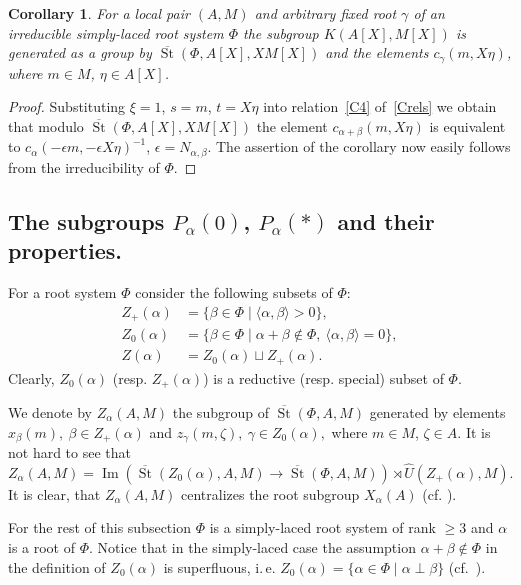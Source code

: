 \documentclass[oneside, 8pt]{amsart}
\newtheorem{corollary}{Corollary}
\theoremstyle{remark}
\theoremstyle{definition}
\DeclareMathOperator{\Img}{Im}
\DeclareMathOperator{\St}{St}
\numberwithin{equation}{section}
\begin{document}
\begin{corollary} \label{Kgen-strong} For a local pair $(A, M)$ and arbitrary fixed root $\gamma$ of an irreducible simply-laced root system $\Phi$ the subgroup $K(A[X], M[X])$ is generated as a group by $\overline{\St}(\Phi, A[X], XM[X])$ and the elements $c_{\gamma}(m, X\eta)$, where $m \in M$, $\eta \in A[X]$. \end{corollary}
\begin{proof} Substituting $\xi = 1$, $s = m$, $t = X\eta$ into relation~\eqref{C4} of~\cref{Crels} we obtain that modulo 
 $\overline{\St}(\Phi, A[X], XM[X])$ the element $c_{\alpha + \beta}(m, X\eta)$ is equivalent to $c_{\alpha}(-\epsilon m, -\epsilon X \eta)^{-1}$, $\epsilon = N_{\alpha, \beta}$. The assertion of the corollary now easily follows from the irreducibility of $\Phi$.
\end{proof}

\subsection{The subgroups \texorpdfstring{$P_\alpha(0)$}{Pa(0)}, \texorpdfstring{$P_\alpha(*)$}{Pa(*)} and their properties.} 
For a root system $\Phi$ consider the following subsets of $\Phi$:
\begin{align} Z_+(\alpha) & = \{ \beta \in \Phi \mid \langle \alpha, \beta \rangle > 0 \}, \\
   Z_0(\alpha) & = \{ \beta \in \Phi \mid \alpha + \beta \not\in \Phi,\ \langle \alpha, \beta \rangle = 0 \}, \\
   Z(\alpha)   & = Z_0(\alpha) \sqcup Z_+(\alpha). \end{align} 
Clearly, $Z_0(\alpha)$ (resp. $Z_+(\alpha)$) is a reductive (resp. special) subset of $\Phi$.
   
We denote by $Z_\alpha(A, M)$ the subgroup of $\overline{\St}(\Phi, A, M)$ generated by elements
 $x_{\beta}(m),\ \beta \in Z_+(\alpha)$ and $z_{\gamma}(m, \zeta),\ \gamma \in Z_0(\alpha),$ where $m \in M$, $\zeta \in A$.
It is not hard to see that \[Z_\alpha(A, M) = \Img\left(\overline{\St}(Z_0(\alpha), A, M) \to \overline{\St}(\Phi, A, M)\right) \rtimes \hat{U}(Z_+(\alpha), M). \]
It is clear, that $Z_\alpha(A, M)$ centralizes the root subgroup $X_\alpha(A)$ (cf. \cite[984]{St71}).

For the rest of this subsection $\Phi$ is a simply-laced root system of rank $\geq 3$ and $\alpha$ is a root of $\Phi$. Notice that in the simply-laced case the assumption $\alpha+\beta\not\in \Phi$ in the definition of $Z_0(\alpha)$ is superfluous, i.\,e. $Z_0(\alpha) = \{ \alpha\in\Phi \mid \alpha \perp \beta \}$
(cf.~\cite[Proposition~5.7]{St71}).
\end{document}
